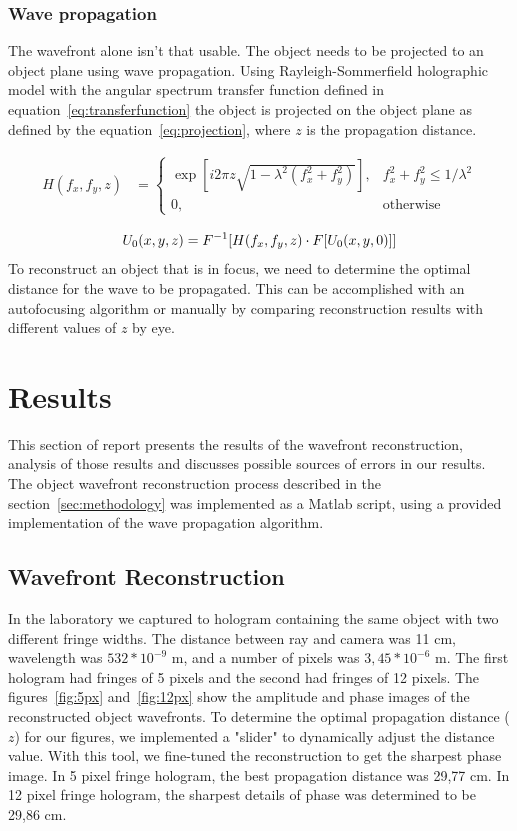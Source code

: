 \documentclass[12pt,a4paper,english
]{tunithesis}
\begin{document}
\subsection{Wave propagation}
The wavefront alone isn't that usable. The object needs to be projected to an object plane using wave propagation. Using Rayleigh-Sommerfield holographic model with the angular spectrum transfer function defined in equation~\ref{eq:transferfunction} the object is projected on the object plane as defined by the equation~\ref{eq:projection}, where $z$ is the propagation distance. 

\begin{align}
H(f_x,f_y,z) &=
\begin{cases}
\exp[i2\pi z \sqrt{1 - \lambda^2 (f_x^2 + f_y^2)}],& f_x^2 + f_y^2 \leq 1/\lambda^2 \\
0, & \text{otherwise}
\end{cases} \label{eq:transferfunction}
\end{align}

\begin{align}
U_0(x,y,z) &= F^{-1}[H(f_x,f_y,z) \cdot F[U_0(x,y,0)]] \notag \\
\label{eq:projection}
\end{align}
To reconstruct an object that is in focus, we need to determine the optimal distance for the wave to be propagated. This can be accomplished with an autofocusing algorithm or manually by comparing reconstruction results with different values of $z$ by eye.

\chapter{Results}
\label{sec:results}
This section of report presents the results of the wavefront reconstruction, analysis of those results and discusses possible sources of errors in our results. The object wavefront reconstruction process described in the section~\ref{sec:methodology} was implemented as a Matlab script, using a provided implementation of the wave propagation algorithm. 

\section{Wavefront Reconstruction}
In the laboratory we captured to hologram containing the same object with two different fringe widths. The distance between ray and camera was 11 cm, wavelength was ${532 * 10^{-9}}$ m, and a number of pixels was ${3,45*10^{-6}}$ m. The first hologram had fringes of 5 pixels and the second had fringes of 12 pixels. The figures~\ref{fig:5px} and~\ref{fig:12px} show the amplitude and phase images of the reconstructed object wavefronts. 
To determine the optimal propagation distance ($z$) for our figures, we implemented a "slider" to dynamically adjust the distance value. With this tool, we fine-tuned the reconstruction to get the sharpest phase image. In 5 pixel fringe hologram, the best propagation distance was 29,77 cm. In 12 pixel fringe hologram, the sharpest details of phase was determined to be 29,86 cm.
\end{document}
